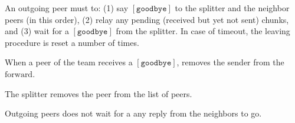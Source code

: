 
\label{sec:leaving}

An outgoing peer must to: (1) say $[\mathtt{goodbye}]$ to the splitter
and the neighbor peers (in this order), (2) relay any pending
(received but yet not sent) chunks, and (3) wait for a
$[\mathtt{goodbye}]$ from the splitter. In case of timeout, the
leaving procedure is reset a number of times.

When a peer of the team receives a $[\mathtt{goodbye}]$, removes the
sender from the $\text{forward}$.

The splitter removes the peer from the list of peers.

Outgoing peers does not wait for a any reply from the neighbors to go.

\begin{comment}
\begin{figure*}
  \fig{400}{4cm}{leaving}
  \caption{Leaving a team.\label{fig:leaving}}
\end{figure*}

All these rules have been describen in Fig.~\ref{fig:leaving}.
\end{comment}

\begin{comment}
An outgoing peer $P_o$ (see Fig.~\ref{fig:leaving}) must to: (1) say
$[\mathtt{goodbye}]$ to $S$ and to $T^o$ (in this order), (2)
relay any pending (received but yet not sent) chunks, and (3) wait for
a $[\mathtt{goodbye}]$ from $S$, which performs $T = T \setminus
P_o$. In case of a timeout, $P_o$ resets the leaving procedure,
for a maximum number of times.

When a $P_k$ receives a $[\mathtt{goodbye}]$ from $P_o$, $P_k$
removes $P_o$ from its neighbors set, by running $T^k = T^k
\setminus P_o$.
\end{comment}
